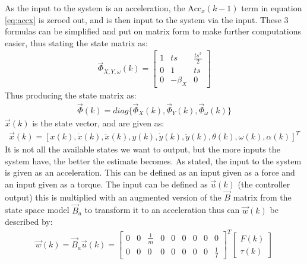 As the input to the system is an acceleration, the $\text{Acc}_x(k-1)$ term in equation \vref{eq:accx} is zeroed out, and is then input to the system via the input. These 3 formulas can be simplified and put on matrix form to make further computations easier, thus stating the state matrix as: 
\begin{align}
\vec{\Phi}_{X,Y,\omega}(k) = \begin{bmatrix}
1 & ts & \frac{ts^2}{2}\\
0 & 1 & ts\\
0 & -\beta _{X} & 0
\end{bmatrix}
\end{align}
Thus producing the state matrix as:
\begin{align}
\vec{\Phi}(k) = diag\{\vec{\Phi}_{X}(k),\vec{\Phi}_{Y}(k),\vec{\Phi}_{\omega}(k)\} 
\end{align}
$\vec{x}(k)$ is the state vector, and are given as:
\begin{align}
\vec{x}(k) = [x(k),\dot{x}(k),\ddot{x}(k),y(k),\dot{y}(k),\ddot{y}(k),\theta(k),\omega(k),\alpha(k)]^T
\end{align}
It is not all the available states we want to output, but the more inputs the system have, the better the estimate becomes. As stated, the input to the system is given as an acceleration. This can be defined as an input given as a force and an input given as a torque. The input can be defined as $\vec{u}(k)$ (the controller output) this is multiplied with an augmented version of the $\vec{B}$ matrix from the state space model $\vec{B}_a$ to transform it to an acceleration thus can $\vec{w}(k)$ be described by:
\begin{align}
\vec{w}(k) = \vec{B}_a\vec{u}(k) = \begin{bmatrix}
0 & 0 & \frac{1}{m} & 0 & 0 & 0 & 0 & 0 & 0\\
0 & 0 & 0 & 0 & 0 & 0 & 0 & 0 & \frac{1}{I}
\end{bmatrix}^T\begin{bmatrix}
F(k)\\
\tau(k)
\end{bmatrix}
\end{align}

